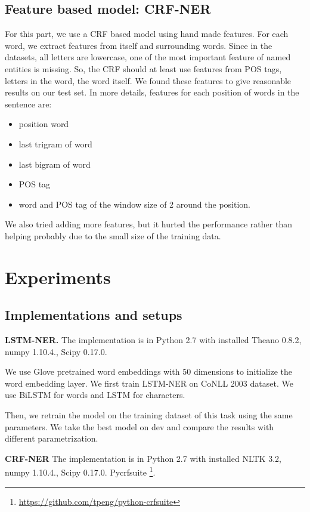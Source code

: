 \documentclass[11pt]{article}
\begin{document}
\subsection{Feature based model: CRF-NER}
For this part, we use a CRF based model using hand made features. 
For each word, we extract features from itself and surrounding words.
Since in the datasets, all letters are lowercase, one of the 
most important feature of named entities is missing. 
So, the CRF should at least use features from POS tags, letters in the word, the word itself.
We found these features to give reasonable results on our test set. 
In more details, features for each position of words in the sentence are:
\begin{itemize}
\item 
position word 
\item 
last trigram of word
\item 
last bigram of word
\item 
POS tag
\item 
word and POS tag of the window size of 2 around the position.
\end{itemize}

We also tried adding more features, but it hurted the performance rather than helping
probably due to the small size of the training data. 

\section{Experiments}
\subsection{Implementations and setups}
\textbf{LSTM-NER.}
The implementation is in Python 2.7 with
installed Theano 0.8.2, numpy 1.10.4., Scipy 0.17.0. 

We use Glove pretrained word embeddings with 50 dimensions to initialize the 
word embedding layer.
We first train LSTM-NER on CoNLL 2003 dataset. 
We use BiLSTM for words and LSTM for characters. 

Then, we retrain the model on the training dataset of this task using 
the same parameters. 
We take the best model on dev and compare the results with different parametrization. 

\textbf{CRF-NER}
The implementation is in Python 2.7 with
installed NLTK 3.2, numpy 1.10.4., Scipy 0.17.0. 
Pycrfsuite \footnote{\url{https://github.com/tpeng/python-crfsuite}}.
\end{document}
